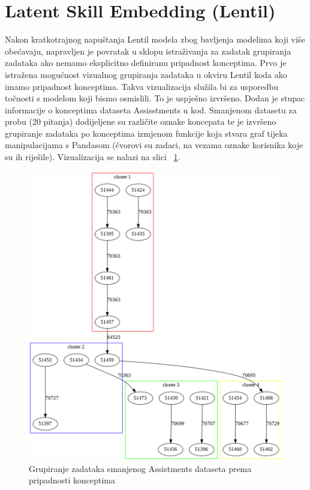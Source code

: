 \documentclass[times, utf8,projekt]{fer}
\begin{document}
\section{Latent Skill Embedding (Lentil)}

\noindent Nakon kratkotrajnog napuštanja Lentil modela zbog bavljenja modelima koji više obećavaju, napravljen je povratak u sklopu istraživanja za zadatak grupiranja zadataka ako nemamo eksplicitno definiranu pripadnost konceptima.\newline
Prvo je istražena mogućnost vizualnog grupiranja zadataka u okviru Lentil koda ako imamo pripadnost konceptima. Takva vizualizacija služila bi za usporedbu točnosti s modelom koji bismo osmislili. To je uspješno izvršeno. Dodan je stupac informacije o konceptima dataseta Assisstments u kod. Smanjenom datasetu za probu (20 pitanja) dodijeljene su različite oznake koncepata te je izvršeno grupiranje zadataka po konceptima izmjenom funkcije koja stvara graf tijeka manipulacijama s Pandasom (čvorovi su zadaci, na vezama oznake korisnika koje su ih riješile). Vizualizacija se nalazi na slici ~\ref{fig:clust1}.

\begin{figure}[!htb]
\centering
\includegraphics[scale=0.3]{clust1.png}
\caption{Grupiranje zadataka smanjenog Assistments dataseta prema pripadnosti konceptima}
\label{fig:clust1}
\end{figure}
\end{document}

